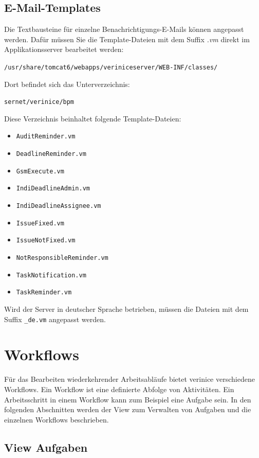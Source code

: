 \documentclass[a4paper,10pt]{book}
\begin{document}
\subsection{E-Mail-Templates}

Die Textbausteine für einzelne Benachrichtigungs-E-Mails können
angepasst werden. Dafür müssen Sie die Template-Dateien mit dem Suffix
\textit{.vm} direkt im Applikationsserver bearbeitet werden:

\texttt{/usr/share/tomcat6/webapps/veriniceserver/WEB-INF/classes/}

Dort befindet sich das Unterverzeichnis:

\texttt{sernet/verinice/bpm}

Diese Verzeichnis beinhaltet folgende Template-Dateien:

\begin{itemize}
  \item \texttt{AuditReminder.vm}
  \item \texttt{DeadlineReminder.vm}
  \item \texttt{GsmExecute.vm}
  \item \texttt{IndiDeadlineAdmin.vm}
  \item \texttt{IndiDeadlineAssignee.vm}
  \item \texttt{IssueFixed.vm}
  \item \texttt{IssueNotFixed.vm}
  \item \texttt{NotResponsibleReminder.vm}
  \item \texttt{TaskNotification.vm}
  \item \texttt{TaskReminder.vm}
\end{itemize}

Wird der Server in deutscher Sprache betrieben, müssen die Dateien mit
dem Suffix \texttt{\_de.vm} angepasst werden.

\section{Workflows}
\label{sec:workflows}
Für das Bearbeiten wiederkehrender Arbeitsabläufe bietet verinice verschiedene
Workflows. Ein Workflow ist eine definierte Abfolge von Aktivitäten. Ein
Arbeitsschritt in einem Workflow kann zum Beispiel eine Aufgabe sein. In den
folgenden Abschnitten werden der View zum Verwalten von Aufgaben und die
einzelnen Workflows beschrieben.

\subsection{View Aufgaben}
\end{document}
